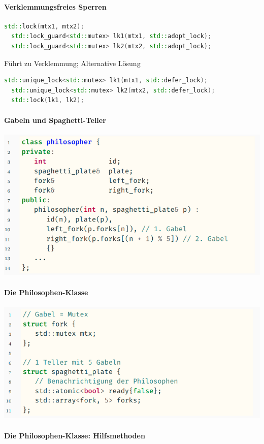 \documentclass[10pt]{article}
\begin{document}
  \paragraph{Verklemmungsfreies Sperren}
  
  \begin{lstlisting}[language=C++]
  std::lock(mtx1, mtx2);
  std::lock_guard<std::mutex> lk1(mtx1, std::adopt_lock);
  std::lock_guard<std::mutex> lk2(mtx2, std::adopt_lock);
  \end{lstlisting}
  Führt zu Verklemmung; Alternative Lösung
  \begin{lstlisting}[language=C++]
  std::unique_lock<std::mutex> lk1(mtx1, std::defer_lock);
  std::unique_lock<std::mutex> lk2(mtx2, std::defer_lock);
  std::lock(lk1, lk2);
  \end{lstlisting}
  
  \paragraph{Gabeln und Spaghetti-Teller}
  
  \begin{center}
    \includegraphics[width=0.4\linewidth]{Assets/Programmierparadigmen-code-snippet-25}
  \end{center}
  
  \paragraph{Die Philosophen-Klasse}
  
  \begin{center}
    \includegraphics[width=0.4\linewidth]{Assets/Programmierparadigmen-code-snippet-26}
  \end{center}
  
  \paragraph{Die Philosophen-Klasse: Hilfsmethoden}
  
\end{document}
